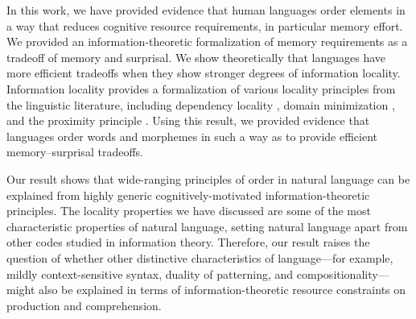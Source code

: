\documentclass[11pt,letterpaper]{article}
\newcommand{\jd}[1]{\textcolor{Purple}{[jd: #1]}}
\newcommand\mhahn[1]{{\color{red}(mhahn #1)}}
\begin{document}
In this work, we have provided evidence that human languages order elements in a way that reduces cognitive resource requirements, in particular memory effort.
We provided an information-theoretic formalization of memory requirements as a tradeoff of memory and surprisal.
We show theoretically that languages have more efficient tradeoffs when they show stronger degrees of information locality.
Information locality provides a formalization of various locality principles from the linguistic literature, including dependency locality \citep{gibson1998linguistic}, domain minimization \citep{hawkins2004efficiency}, and the proximity principle \citep{givon1985iconicity}.
Using this result, we provided evidence that languages order words and morphemes in such a way as to provide efficient memory--surprisal tradeoffs.

Our result shows that wide-ranging principles of order in natural language can be explained from highly generic cognitively-motivated information-theoretic principles. The locality properties we have discussed are some of the most characteristic properties of natural language, setting natural language apart from other codes studied in information theory.
Therefore, our result raises the question of whether other distinctive characteristics of language---for example, mildly context-sensitive syntax, duality of patterning, and compositionality---might also be explained in terms of information-theoretic resource constraints on production and comprehension.



\end{document}
